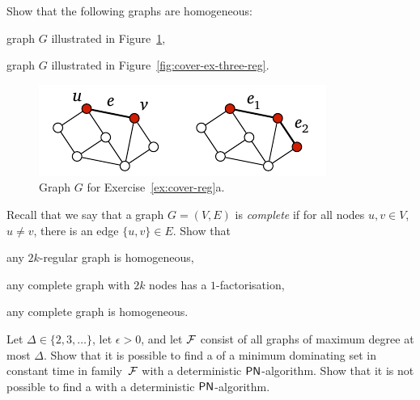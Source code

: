 \begin{ex}\label{ex:cover-reg}
    Show that the following graphs are homogeneous:
    \begin{subex}
        \item graph $G$ illustrated in Figure~\ref{fig:cover-ex-four-reg},
        \item graph $G$ illustrated in Figure~\ref{fig:cover-ex-three-reg}.
    \end{subex}


    \begin{figure}
        \centering
        \includegraphics[page=\PCoverExFourReg]{figs.pdf}
        \caption{Graph $G$ for Exercise~\ref{ex:cover-reg}a.}\label{fig:cover-ex-four-reg}
    \end{figure}
\end{ex}

\begin{ex}\label{ex:cover-complete}
    Recall that we say that a graph $G = (V,E)$ is \emph{complete} if for all nodes $u, v \in V$, $u \ne v$, there is an edge $\{u,v\} \in E$. Show that
    \begin{subex}
        \item any $2k$-regular graph is homogeneous,
        \item any complete graph with $2k$ nodes has a $1$-factorisation,
        \item any complete graph is homogeneous.
    \end{subex}
\end{ex}

\begin{ex}\label{ex:domset}
    Let $\Delta \in \{2,3,\dotsc\}$, let $\epsilon > 0$, and let $\mathcal{F}$ consist of all graphs of maximum degree at most $\Delta$. Show that it is possible to find a  of a minimum dominating set in constant time in family~$\mathcal{F}$ with a deterministic $\textup{\sffamily PN}$-algorithm. Show that it is not possible to find a  with a deterministic $\textup{\sffamily PN}$-algorithm.
    
\end{ex}

